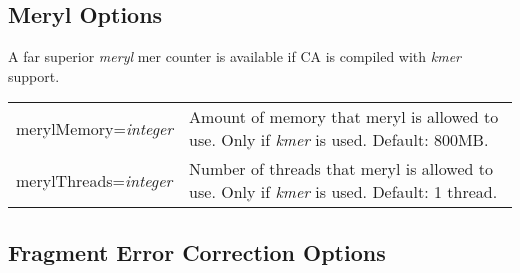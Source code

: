 \documentclass[twoside,11pt]{article}
\begin{document}
\subsection{Meryl Options}
\label{sec:merylopts}

A far superior {\em meryl} mer counter is available if CA is compiled
with {\em kmer} support.

\begin{longtable}{lp{3.0in}}
merylMemory={\it integer} &
Amount of memory that meryl is allowed to use.  Only if {\em kmer} is
used.  Default: 800MB.
\\
merylThreads={\it integer} &
Number of threads that meryl is allowed to use.  Only if {\em kmer} is
used.  Default: 1 thread.
\\
\end{longtable}



\subsection{Fragment Error Correction Options}
\label{sec:frgcorr}
\end{document}
